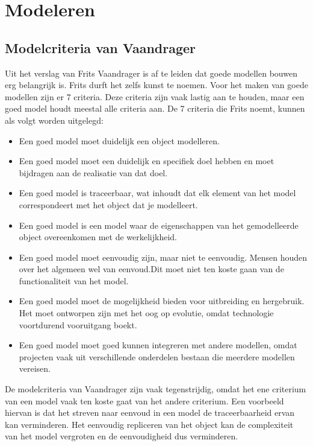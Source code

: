 \documentclass{article} %
\begin{document}
\section{Modeleren}

\subsection{Modelcriteria van Vaandrager}

Uit het verslag van Frits Vaandrager is af te leiden dat goede modellen bouwen erg belangrijk is. Frits durft het zelfs kunst te noemen. Voor het maken van goede modellen zijn er 7 criteria. Deze criteria zijn vaak lastig aan te houden, maar een goed model houdt meestal alle criteria aan. De 7 criteria die Frits noemt, kunnen als volgt worden uitgelegd:
\begin{itemize}
    \item Een goed model moet duidelijk een object modelleren. 
    \item Een goed model moet een duidelijk en specifiek doel hebben en moet bijdragen aan de realisatie van dat doel. 
    \item Een goed model is traceerbaar, wat inhoudt dat elk element van het model correspondeert met het object dat je modelleert. 
    \item Een goed model is een model waar de eigenschappen van het gemodelleerde object overeenkomen met de werkelijkheid. 
    \item Een goed model moet eenvoudig zijn, maar niet te eenvoudig. Mensen houden over het algemeen wel van eenvoud.Dit moet niet ten koste gaan van de functionaliteit van het model. 
    \item Een goed model moet de mogelijkheid bieden voor uitbreiding en hergebruik. Het moet ontworpen zijn met het oog op evolutie, omdat technologie voortdurend vooruitgang boekt.
    \item Een goed model moet goed kunnen integreren met andere modellen, omdat projecten vaak uit verschillende onderdelen bestaan die meerdere modellen vereisen.


\end{itemize}
De modelcriteria van Vaandrager zijn vaak tegenstrijdig, omdat het ene criterium van een model vaak ten koste gaat van het andere criterium. Een voorbeeld hiervan is dat het streven naar eenvoud in een model de traceerbaarheid ervan kan verminderen. Het eenvoudig repliceren van het object kan de complexiteit van het model vergroten en de eenvoudigheid dus verminderen.
\end{document}
